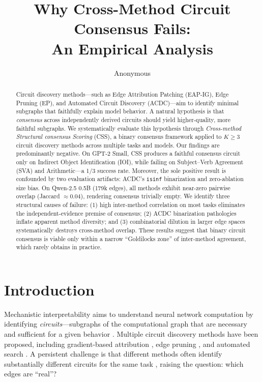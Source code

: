 \documentclass[11pt,a4paper]{article}
\title{Why Cross-Method Circuit Consensus Fails:\\An Empirical Analysis}
\author{Anonymous}
\newcommand{\css}{\textsc{CSS}}
\newcommand{\eapig}{\textsc{EAP-IG}}
\newcommand{\ep}{\textsc{EP}}
\newcommand{\acdc}{\textsc{ACDC}}
\begin{document}
\maketitle

\begin{abstract}
Circuit discovery methods---such as Edge Attribution Patching (\eapig{}), Edge Pruning (\ep{}), and Automated Circuit Discovery (\acdc{})---aim to identify minimal subgraphs that faithfully explain model behavior. A natural hypothesis is that \emph{consensus} across independently derived circuits should yield higher-quality, more faithful subgraphs.
We systematically evaluate this hypothesis through \emph{Cross-method Structural consensus Scoring} (\css{}), a binary consensus framework applied to $K \ge 3$ circuit discovery methods across multiple tasks and models.
Our findings are predominantly negative.
On GPT-2 Small, \css{} produces a faithful consensus circuit only on Indirect Object Identification (IOI), while failing on Subject--Verb Agreement (SVA) and Arithmetic---a 1/3 success rate.
Moreover, the sole positive result is confounded by two evaluation artifacts: \acdc{}'s \texttt{isinf} binarization and zero-ablation size bias.
On Qwen-2.5 0.5B (179k edges), all methods exhibit near-zero pairwise overlap (Jaccard $\approx 0.04$), rendering consensus trivially empty.
We identify three structural causes of failure: (1) high inter-method correlation on most tasks eliminates the independent-evidence premise of consensus; (2) \acdc{} binarization pathologies inflate apparent method diversity; and (3) combinatorial dilution in larger edge spaces systematically destroys cross-method overlap.
These results suggest that binary circuit consensus is viable only within a narrow ``Goldilocks zone'' of inter-method agreement, which rarely obtains in practice.
\end{abstract}

\section{Introduction}
\label{sec:intro}

Mechanistic interpretability aims to understand neural network computation by identifying \emph{circuits}---subgraphs of the computational graph that are necessary and sufficient for a given behavior \citep{olah2020zoom,wang2023interpretability,conmy2023automated}.
Multiple circuit discovery methods have been proposed, including gradient-based attribution \citep{syed2023attribution}, edge pruning \citep{hanna2024does}, and automated search \citep{conmy2023automated}.
A persistent challenge is that different methods often identify substantially different circuits for the same task \citep{mondorf2025beyond}, raising the question: which edges are ``real''?
\end{document}
